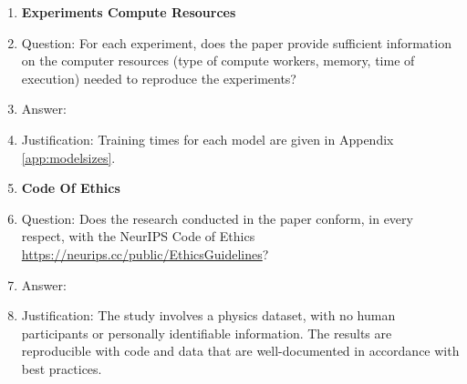 \documentclass{article}
\begin{document}
\begin{enumerate}
\item {\bf Experiments Compute Resources}
    \item[] Question: For each experiment, does the paper provide sufficient information on the computer resources (type of compute workers, memory, time of execution) needed to reproduce the experiments?
    \item[] Answer: \answerYes{} %
    \item[] Justification: Training times for each model are given in Appendix \ref{app:modelsizes}. 
    
\item {\bf Code Of Ethics}
    \item[] Question: Does the research conducted in the paper conform, in every respect, with the NeurIPS Code of Ethics \url{https://neurips.cc/public/EthicsGuidelines}?
    \item[] Answer: \answerYes{} %
    \item[] Justification: The study involves a physics dataset, with no human participants or personally identifiable information. The results are reproducible with code and data that are well-documented in accordance with best practices. 



\end{enumerate}
\end{document}
